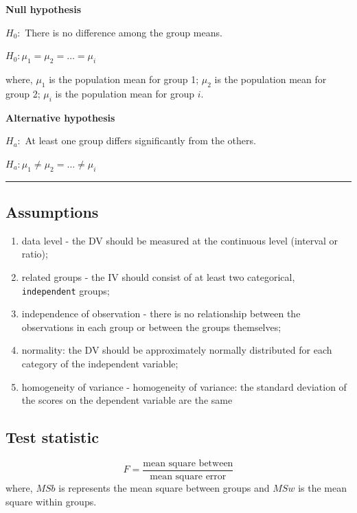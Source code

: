 \documentclass[
]{article}
\providecommand{\tightlist}{%
  \setlength{\itemsep}{0pt}\setlength{\parskip}{0pt}}
\begin{document}
\textbf{Null hypothesis}

\(H_0:\) There is no difference among the group means.

\(H_0:\mu_1 = \mu_2 = \ldots = \mu_i\)

where, \(\mu_1\) is the population mean for group 1; \(\mu_2\) is the population mean for group 2; \(\mu_i\) is the population mean for group \(i\).

\textbf{Alternative hypothesis}

\(H_a:\) At least one group differs significantly from the others.

\(H_a:\mu_1 \neq \mu_2 = \ldots \neq \mu_i\)

\begin{center}\rule{0.5\linewidth}{0.5pt}\end{center}

\hypertarget{assumptions}{%
\subsection{Assumptions}\label{assumptions}}

\begin{enumerate}
\def\labelenumi{\arabic{enumi}.}
\tightlist
\item
  data level - the DV should be measured at the continuous level (interval or ratio);
\item
  related groups - the IV should consist of at least two categorical, \texttt{independent} groups;
\item
  independence of observation - there is no relationship between the observations in each group or between the groups themselves;
\item
  normality: the DV should be approximately normally distributed for each category of the independent variable;
\item
  homogeneity of variance - homogeneity of variance: the standard deviation of the scores on the dependent variable are the same
\end{enumerate}

\hypertarget{test-statistic}{%
\subsection{Test statistic}\label{test-statistic}}

\[
F = \dfrac{\mbox{mean square between}}{\mbox{mean square error}}
\] where, \(MSb\) is represents the mean square between groups and \(MSw\) is the mean square within groups.
\end{document}
